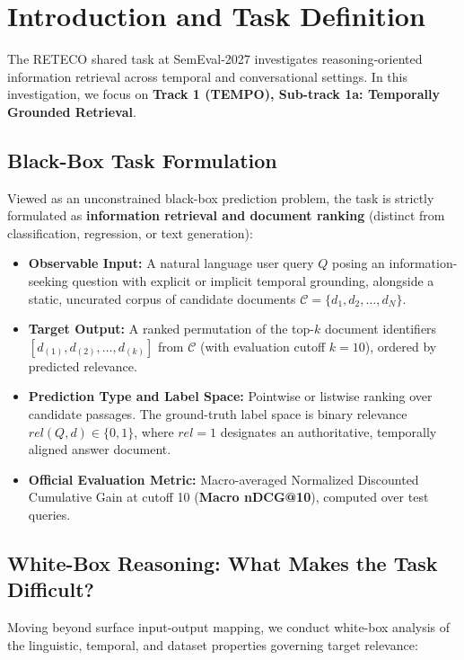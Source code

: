 \section{Introduction and Task Definition}
\label{sec:intro}

The RETECO shared task at SemEval-2027 \cite{tempo,recor} investigates reasoning-oriented information retrieval across temporal and conversational settings. In this investigation, we focus on \textbf{Track 1 (TEMPO), Sub-track 1a: Temporally Grounded Retrieval}. 

\subsection{Black-Box Task Formulation}
Viewed as an unconstrained black-box prediction problem, the task is strictly formulated as \textbf{information retrieval and document ranking} (distinct from classification, regression, or text generation):
\begin{itemize}
    \item \textbf{Observable Input:} A natural language user query $Q$ posing an information-seeking question with explicit or implicit temporal grounding, alongside a static, uncurated corpus of candidate documents $\mathcal{C} = \{d_1, d_2, \dots, d_N\}$.
    \item \textbf{Target Output:} A ranked permutation of the top-$k$ document identifiers $[d_{(1)}, d_{(2)}, \dots, d_{(k)}]$ from $\mathcal{C}$ (with evaluation cutoff $k=10$), ordered by predicted relevance.
    \item \textbf{Prediction Type and Label Space:} Pointwise or listwise ranking over candidate passages. The ground-truth label space is binary relevance $rel(Q, d) \in \{0, 1\}$, where $rel=1$ designates an authoritative, temporally aligned answer document.
    \item \textbf{Official Evaluation Metric:} Macro-averaged Normalized Discounted Cumulative Gain at cutoff 10 (\textbf{Macro nDCG@10}), computed over test queries.
\end{itemize}

\subsection{White-Box Reasoning: What Makes the Task Difficult?}
Moving beyond surface input-output mapping, we conduct white-box analysis of the linguistic, temporal, and dataset properties governing target relevance:

